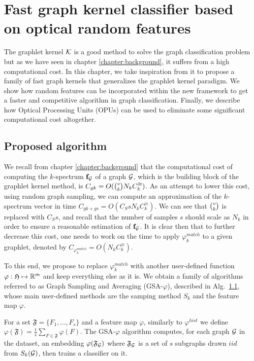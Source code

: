 \chapter{Fast graph kernel classifier based on optical random features }
\label{chapter:fast_algorithm}
\newtheorem{lemma}{Lemma} 
The graphlet kernel $\mathcal{K}$ is a good method to solve the graph classification problem but as we have seen in chapter \ref{chapter:background}, it suffers from a high computational cost. In this chapter, we take inspiration from it to propose a family of fast graph kernels that generalizes the graphlet kernel paradigm. We show how random features can be incorporated within the new framework to get a faster and competitive algorithm in graph classification. Finally, we describe how Optical Processing Units (OPUs) can be used to eliminate some significant computational cost altogether.

\section{Proposed algorithm}
\label{alg:GSA}
We recall from chapter \ref{chapter:background} that the computational cost of computing the $k$-spectrum $\mathbf{f}_{\mathcal{G}}$ of a graph $\mathcal{G}$, which is the building block of the graphlet kernel method, is $C_{gk}= O(\tbinom{v}{k} N_k C_k^{\cong})$. As an attempt to lower this cost, using random graph sampling, we can compute an approximation of the $k$-spectrum vector in time $C_{gk + gs}= O(C_S s N_k C_k^{\cong})$. We can see that $\tbinom{v}{k}$ is replaced with $C_S s$, and recall that the number of samples $s$  should scale as $N_k$ in order to ensure a reasonable estimation of $\mathbf{f}_{\mathcal{G}}$. It is clear then that to further decrease this cost, one needs to work on the time to apply $\varphi_k^{match}$ to a given graphlet, denoted by $C_{\varphi_k^{match}}=O(N_k C_k^{\cong})$.

To this end, we propose to replace $\varphi^{match}_k$ with another user-defined function $\varphi:\mathfrak{H} \mapsto\mathbb{R}^m$ and keep everything else as it is. We obtain a family of algorithms referred to as Graph Sampling and Averaging (GSA-$\varphi$), described in Alg.~\ref{alg:GSA}, whose main user-defined methods are the samping method $S_k$ and the feature map $\varphi$.

For a set $\mathfrak{F} = \{F_1,\ldots, F_s\}$ and a feature map $\varphi$, similarly to ${\varphi}^{hist}$ we define ${\varphi}(\mathfrak{F}) = \frac{1}{s} \sum_{F\in\mathfrak{F}} \varphi(F)$. The GSA-$\varphi$ algorithm computes, for each graph $\mathcal{G}$ in the dataset, an embedding ${\varphi}(\mathfrak{F}_{\mathcal{G}})$ where $\mathfrak{F}_{\mathcal{G}}$ is a set of $s$ subgraphs drawn $iid$ from $S_k(\mathcal{G})$, then trains a classifier on it.

